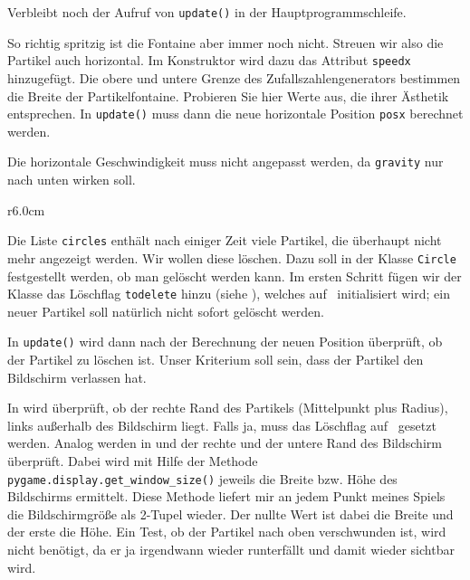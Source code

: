 
Verbleibt noch der Aufruf von \texttt{update()} in der Hauptprogrammschleife.


So richtig spritzig ist die Fontaine aber immer noch nicht. Streuen wir also die Partikel auch horizontal. Im Konstruktor wird dazu das Attribut \texttt{speedx} hinzugefügt. Die obere und untere Grenze des Zufallszahlengenerators bestimmen die Breite der Partikelfontaine. Probieren Sie hier Werte aus, die ihrer Ästhetik entsprechen. In \texttt{update()} muss dann die neue horizontale Position \texttt{posx} berechnet werden. 

Die horizontale Geschwindigkeit muss nicht angepasst werden, da \texttt{gravity} nur nach unten wirken soll.


\begin{wrapfigure}[17]{r}{6.0cm}%
	\begin{center}%
		\vspace{-1cm}%
	\end{center}%
\end{wrapfigure}%
Die Liste \texttt{circles} enthält nach einiger Zeit viele Partikel, die überhaupt nicht mehr angezeigt werden. Wir wollen diese löschen. Dazu soll in der Klasse \texttt{Circle} festgestellt werden, ob man gelöscht werden kann. Im ersten Schritt fügen wir der Klasse das Löschflag \texttt{todelete} hinzu (siehe ), welches auf \false\ initialisiert wird; ein neuer Partikel soll natürlich nicht sofort gelöscht werden.

In \texttt{update()} wird dann nach der Berechnung der neuen Position überprüft, ob der Partikel zu löschen ist. Unser Kriterium soll sein, dass der Partikel den Bildschirm verlassen hat.

In  wird überprüft, ob der rechte Rand des Partikels (Mittelpunkt plus Radius), links außerhalb des Bildschirm liegt. Falls ja, muss das Löschflag auf \true\ gesetzt werden. Analog werden in  und  der rechte und der untere Rand des Bildschirm überprüft. Dabei wird mit Hilfe der Methode \texttt{pygame.display.get\_window\_size()} jeweils die Breite bzw. Höhe des Bildschirms ermittelt. Diese Methode liefert mir an jedem Punkt meines Spiels die Bildschirmgröße als 2-Tupel wieder. Der nullte Wert ist dabei die Breite und der erste die Höhe. Ein Test, ob der Partikel nach oben verschwunden ist, wird nicht benötigt, da er ja irgendwann wieder runterfällt und damit wieder sichtbar wird.

